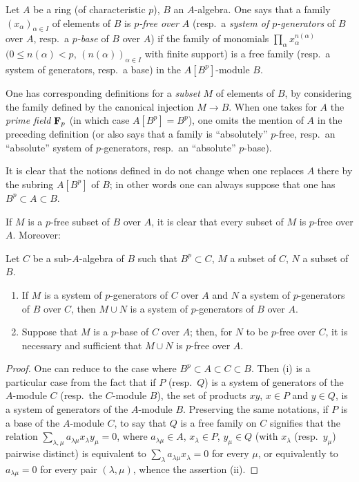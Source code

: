 \begin{definition}[21.1.9]
\label{0.21.1.9}
Let $A$ be a ring (of characteristic $p$), $B$ an $A$-algebra.
One says that a family $(x_\alpha)_{\alpha\in I}$ of elements of $B$ is \emph{$p$-free over $A$} (resp.\ a \emph{system of $p$-generators} of $B$ over $A$, \textup{resp.}\ a \emph{$p$-base} of $B$ over $A$) if the family of monomials $\prod_\alpha x_\alpha^{n(\alpha)}$ $(0\leq n(\alpha)<p$, $(n(\alpha))_{\alpha\in I}$ with finite support) is a free family (resp.\ a system of generators, resp.\ a base) in the $A[B^p]$-module $B$.
\end{definition}

One has corresponding definitions for a \emph{subset} $M$ of elements of $B$, by considering the family defined by the canonical injection $M\to B$.
When one takes for $A$ the \emph{prime field} $\mathbf{F}_p$ (in which case $A[B^p]=B^p$), one omits the mention of $A$ in the preceding definition (or also says that a family is ``absolutely'' $p$-free, resp.\ an ``absolute'' system of $p$-generators, resp.\ an ``absolute'' $p$-base).

It is clear that the notions defined in  do not change when one replaces $A$ there by the subring $A[B^p]$ of $B$; in other words one can always suppose that one has $B^p\subset A\subset B$.

If $M$ is a $p$-free subset of $B$ over $A$, it is clear that every subset of $M$ is $p$-free over $A$.
Moreover:

\begin{lemma}[21.1.10]
\label{0.21.1.10}
Let $C$ be a sub-$A$-algebra of $B$ such that $B^p\subset C$, $M$ a subset of $C$, $N$ a subset of $B$.
\begin{enumerate}
  \item[\rm(i)] If $M$ is a system of $p$-generators of $C$ over $A$ and $N$ a system of $p$-generators of $B$ over $C$, then $M\cup N$ is a system of $p$-generators of $B$ over $A$.
  \item[\rm(ii)] Suppose that $M$ is a $p$-base of $C$ over $A$; then, for $N$ to be $p$-free over $C$, it is necessary and sufficient that $M\cup N$ is $p$-free over $A$.
\end{enumerate}
\end{lemma}

\begin{proof}
One can reduce to the case where $B^p\subset A\subset C\subset B$.
Then (i) is a particular case from the fact that if $P$ (resp.\ $Q$) is a system of generators of the $A$-module $C$ (resp.\ the $C$-module $B$), the set of products $xy$, $x\in P$ and $y\in Q$, is a system of generators of the $A$-module $B$.
Preserving the same notations, if $P$ is a base of the $A$-module $C$, to say that $Q$ is a free family on $C$ signifies that the relation $\sum_{\lambda,\mu}a_{\lambda\mu}x_\lambda y_\mu=0$, where $a_{\lambda\mu}\in A$, $x_\lambda\in P$, $y_\mu\in Q$ (with $x_\lambda$ (resp.\ $y_\mu$) pairwise distinct) is equivalent to $\sum_\lambda a_{\lambda\mu}x_\lambda=0$ for every $\mu$, or equivalently to $a_{\lambda\mu}=0$ for every pair $(\lambda,\mu)$, whence the assertion (ii).
\end{proof}

